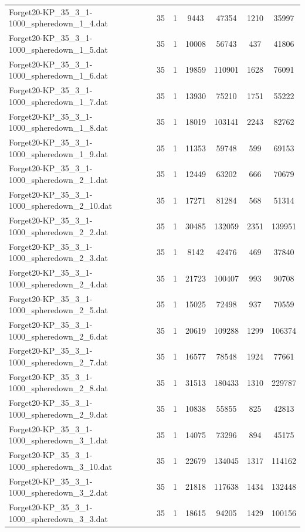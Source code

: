 \begin{table}[!ht]
\begin{tabular}{lcccccc}
Forget20-KP\_35\_3\_1-1000\_spheredown\_1\_4.dat & 35 & 1 & 9443 & 47354 & 1210 & 35997 \\
Forget20-KP\_35\_3\_1-1000\_spheredown\_1\_5.dat & 35 & 1 & 10008 & 56743 & 437 & 41806 \\
Forget20-KP\_35\_3\_1-1000\_spheredown\_1\_6.dat & 35 & 1 & 19859 & 110901 & 1628 & 76091 \\
Forget20-KP\_35\_3\_1-1000\_spheredown\_1\_7.dat & 35 & 1 & 13930 & 75210 & 1751 & 55222 \\
Forget20-KP\_35\_3\_1-1000\_spheredown\_1\_8.dat & 35 & 1 & 18019 & 103141 & 2243 & 82762 \\
Forget20-KP\_35\_3\_1-1000\_spheredown\_1\_9.dat & 35 & 1 & 11353 & 59748 & 599 & 69153 \\
Forget20-KP\_35\_3\_1-1000\_spheredown\_2\_1.dat & 35 & 1 & 12449 & 63202 & 666 & 70679 \\
Forget20-KP\_35\_3\_1-1000\_spheredown\_2\_10.dat & 35 & 1 & 17271 & 81284 & 568 & 51314 \\
Forget20-KP\_35\_3\_1-1000\_spheredown\_2\_2.dat & 35 & 1 & 30485 & 132059 & 2351 & 139951 \\
Forget20-KP\_35\_3\_1-1000\_spheredown\_2\_3.dat & 35 & 1 & 8142 & 42476 & 469 & 37840 \\
Forget20-KP\_35\_3\_1-1000\_spheredown\_2\_4.dat & 35 & 1 & 21723 & 100407 & 993 & 90708 \\
Forget20-KP\_35\_3\_1-1000\_spheredown\_2\_5.dat & 35 & 1 & 15025 & 72498 & 937 & 70559 \\
Forget20-KP\_35\_3\_1-1000\_spheredown\_2\_6.dat & 35 & 1 & 20619 & 109288 & 1299 & 106374 \\
Forget20-KP\_35\_3\_1-1000\_spheredown\_2\_7.dat & 35 & 1 & 16577 & 78548 & 1924 & 77661 \\
Forget20-KP\_35\_3\_1-1000\_spheredown\_2\_8.dat & 35 & 1 & 31513 & 180433 & 1310 & 229787 \\
Forget20-KP\_35\_3\_1-1000\_spheredown\_2\_9.dat & 35 & 1 & 10838 & 55855 & 825 & 42813 \\
Forget20-KP\_35\_3\_1-1000\_spheredown\_3\_1.dat & 35 & 1 & 14075 & 73296 & 894 & 45175 \\
Forget20-KP\_35\_3\_1-1000\_spheredown\_3\_10.dat & 35 & 1 & 22679 & 134045 & 1317 & 114162 \\
Forget20-KP\_35\_3\_1-1000\_spheredown\_3\_2.dat & 35 & 1 & 21818 & 117638 & 1434 & 132448 \\
Forget20-KP\_35\_3\_1-1000\_spheredown\_3\_3.dat & 35 & 1 & 18615 & 94205 & 1429 & 100156 \\

\end{tabular}
\end{table}
